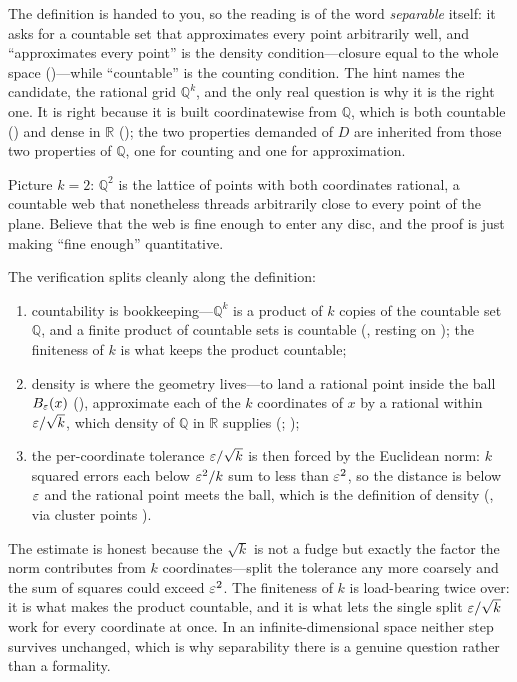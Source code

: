 \documentclass[main.tex]{subfiles}
\begin{document}
\begin{Reflection}
The definition is handed to you, so the reading is of the word \emph{separable} itself: it asks for a
countable set that approximates every point arbitrarily well, and ``approximates every point'' is the
density condition---closure equal to the whole space ()---while ``countable'' is the counting
condition. The hint names the candidate, the rational grid $\mathbb Q^k$, and the only real question is why
it is the right one. It is right because it is built coordinatewise from $\mathbb Q$, which is both
countable () and dense in $\mathbb R$ (); the two properties demanded of $D$ are
inherited from those two properties of $\mathbb Q$, one for counting and one for approximation.

Picture $k=2$: $\mathbb Q^2$ is the lattice of points with both coordinates rational, a countable web that
nonetheless threads arbitrarily close to every point of the plane. Believe that the web is fine enough to
enter any disc, and the proof is just making ``fine enough'' quantitative.

The verification splits cleanly along the definition:
\begin{enumerate}[leftmargin=1.7em,itemsep=3pt,topsep=2pt,label=\textnormal{(\arabic*)}]
  \item countability is bookkeeping---$\mathbb Q^k$ is a product of $k$ copies of the countable set
        $\mathbb Q$, and a finite product of countable sets is countable
        (, resting on ); the finiteness of $k$ is
        what keeps the product countable;
  \item density is where the geometry lives---to land a rational point inside the ball $B_\varepsilon(x)$
        (), approximate each of the $k$ coordinates of $x$ by a rational within
        $\varepsilon/\sqrt k$, which density of $\mathbb Q$ in $\mathbb R$ supplies
        (; );
  \item the per-coordinate tolerance $\varepsilon/\sqrt k$ is then forced by the Euclidean norm: $k$ squared
        errors each below $\varepsilon^2/k$ sum to less than $\varepsilon^2$, so the distance is below $\varepsilon$ and the
        rational point meets the ball, which is the definition of density (, via cluster
        points ).
\end{enumerate}

The estimate is honest because the $\sqrt k$ is not a fudge but exactly the factor the norm contributes
from $k$ coordinates---split the tolerance any more coarsely and the sum of squares could exceed $\varepsilon^2$.
The finiteness of $k$ is load-bearing twice over: it is what makes the product countable, and it is what
lets the single split $\varepsilon/\sqrt k$ work for every coordinate at once. In an infinite-dimensional space
neither step survives unchanged, which is why separability there is a genuine question rather than a
formality.


\end{Reflection}
\end{document}
